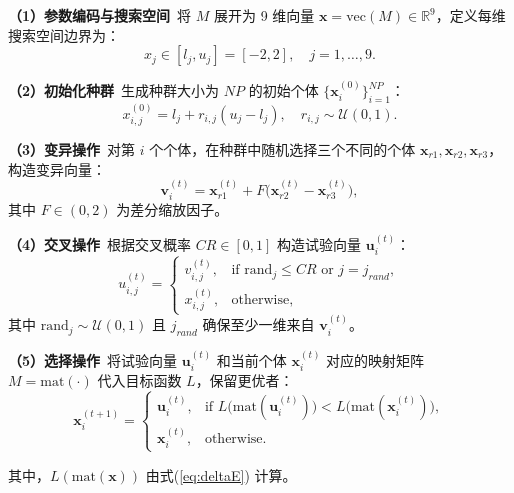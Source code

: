 \noindent\textbf{（1）参数编码与搜索空间}\
将 $M$ 展开为 9 维向量 $\mathbf{x}=\mathrm{vec}(M)\in \mathbb{R}^9$，定义每维搜索空间边界为：
\begin{equation}\label{eq:search_space}
  x_{j}\in [l_j, u_j]=[-2,2],\quad j=1,\dots,9.
\end{equation}

\noindent\textbf{（2）初始化种群}\
生成种群大小为 $NP$ 的初始个体 $\{\mathbf{x}_i^{(0)}\}_{i=1}^{NP}$：
\begin{equation}\label{eq:init_pop}
  x^{(0)}_{i,j} = l_j + r_{i,j}(u_j - l_j),\quad r_{i,j}\sim\mathcal{U}(0,1).
\end{equation}

\noindent\textbf{（3）变异操作}\
对第 $i$ 个个体，在种群中随机选择三个不同的个体 $\mathbf{x}_{r1}, \mathbf{x}_{r2}, \mathbf{x}_{r3}$，构造变异向量：
\begin{equation}\label{eq:mutation}
  \mathbf{v}_i^{(t)} = \mathbf{x}_{r1}^{(t)} + F\bigl(\mathbf{x}_{r2}^{(t)} - \mathbf{x}_{r3}^{(t)}\bigr),
\end{equation}
其中 $F\in (0,2)$ 为差分缩放因子。

\noindent\textbf{（4）交叉操作}\
根据交叉概率 $CR\in [0,1]$ 构造试验向量 $\mathbf{u}_i^{(t)}$：
\begin{equation}\label{eq:crossover}
  u_{i,j}^{(t)} =
  \begin{cases}
    v_{i,j}^{(t)},&\text{if } \mathrm{rand}_j\le CR\text{ or } j=j_{rand},\\
    x_{i,j}^{(t)},&\text{otherwise},
  \end{cases}
\end{equation}
其中 $\mathrm{rand}_j\sim\mathcal{U}(0,1)$ 且 $j_{rand}$ 确保至少一维来自 $\mathbf{v}_i^{(t)}$。

\noindent\textbf{（5）选择操作}\
将试验向量 $\mathbf{u}_i^{(t)}$ 和当前个体 $\mathbf{x}_i^{(t)}$ 对应的映射矩阵 $M=\mathrm{mat}(\cdot)$ 代入目标函数 $L$，保留更优者：
\begin{equation}\label{eq:selection}
  \mathbf{x}_i^{(t+1)} =
  \begin{cases}
    \mathbf{u}_i^{(t)},&\text{if } L\bigl(\mathrm{mat}(\mathbf{u}_i^{(t)})\bigr)<L\bigl(\mathrm{mat}(\mathbf{x}_i^{(t)})\bigr),\\
    \mathbf{x}_i^{(t)},&\text{otherwise}.
  \end{cases}
\end{equation}

其中，$L(\mathrm{mat}(\mathbf{x}))$ 由式(\ref{eq:deltaE}) 计算。

